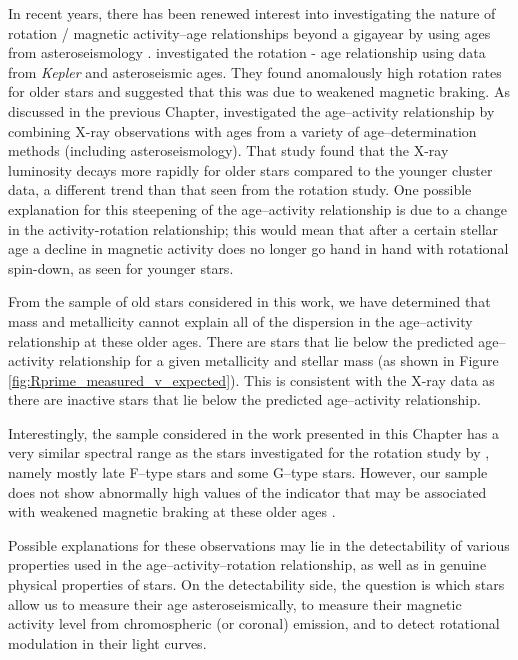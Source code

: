 In recent years, there has been renewed interest into investigating the nature of rotation / magnetic activity--age relationships beyond a gigayear by using ages from asteroseismology \citep{van_Saders_etal_2016,Booth_etal_2017}. \citet{van_Saders_etal_2016} investigated the rotation - age relationship using data from \textit{Kepler} and asteroseismic ages. They found anomalously high rotation rates for older stars and suggested that this was due to weakened magnetic braking. As discussed in the previous Chapter, \citet{Booth_etal_2017} investigated the age--activity relationship by combining X-ray observations with ages from a variety of age--determination methods (including asteroseismology). That study found that the X-ray luminosity decays more rapidly for older stars compared to the younger cluster data, a different trend than that seen from the rotation study. One possible explanation for this steepening of the age--activity relationship is due to a change in the activity-rotation relationship; this would mean that after a certain stellar age a decline in magnetic activity does no longer go hand in hand with rotational spin-down, as seen for younger stars.

From the sample of old stars considered in this work, we have determined that mass and metallicity cannot explain all of the dispersion in the age--activity relationship at these older ages. There are stars that lie below the predicted age--activity relationship for a given metallicity and stellar mass (as shown in Figure \ref{fig:Rprime_measured_v_expected}). This is consistent with the X-ray data \citep{Booth_etal_2017} as there are inactive stars that lie below the predicted age--activity relationship.

Interestingly, the sample considered in the work presented in this Chapter has a very similar spectral range as the stars investigated for the rotation study by \citet{van_Saders_etal_2016}, namely mostly late F--type stars and some G--type stars. However, our sample does not show abnormally high values of the \Rprime indicator that may be associated with weakened magnetic braking at these older ages \citep{van_Saders_etal_2016}.

Possible explanations for these observations may lie in the detectability of various properties used in the age--activity--rotation relationship, as well as in genuine physical properties of stars. On the detectability side, the question is which stars allow us to measure their age asteroseismically, to measure their magnetic activity level from chromospheric (or coronal) emission, and to detect rotational modulation in their light curves.

